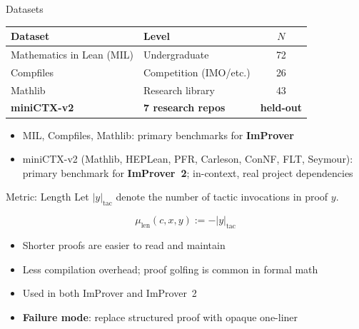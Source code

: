 \documentclass{beamer}
\newcommand{\bad}[1]{\textcolor{improverRed}{\textbf{#1}}}
\begin{document}
\begin{frame}{Datasets}
\vspace{0.5em}
\begin{center}
\small
\begin{tabular}{llc}
\toprule
\textbf{Dataset} & \textbf{Level} & \textbf{$N$}\\
\midrule
Mathematics in Lean (MIL) & Undergraduate & 72\\
Compfiles & Competition (IMO/etc.) & 26\\
Mathlib & Research library & 43\\
\midrule
\textbf{miniCTX-v2} & \textbf{7 research repos} & \textbf{held-out}\\
\bottomrule
\end{tabular}
\end{center}
\vspace{0.5em}
\begin{itemize}\setlength{\itemsep}{6pt}
  \item MIL, Compfiles, Mathlib: primary benchmarks for \textbf{ImProver}
  \item miniCTX-v2 (Mathlib, HEPLean, PFR, Carleson, ConNF, FLT, Seymour): primary benchmark for \textbf{ImProver~2}; in-context, real project dependencies
\end{itemize}
\end{frame}

\begin{frame}{Metric: Length}
\vspace{0.4em}
Let $|y|_{\mathrm{tac}}$ denote the number of tactic invocations in proof $y$.
\vspace{0.3em}
\begin{definition}
\[
  \mu_{\mathrm{len}}(c,x,y) := -|y|_{\mathrm{tac}}
\]
\end{definition}
\vspace{0.4em}
\begin{itemize}\setlength{\itemsep}{6pt}
  \item Shorter proofs are easier to read and maintain
  \item Less compilation overhead; proof golfing is common in formal math
  \item Used in both ImProver and ImProver~2
  \item \bad{Failure mode}: replace structured proof with opaque one-liner
\end{itemize}
\end{frame}
\end{document}
